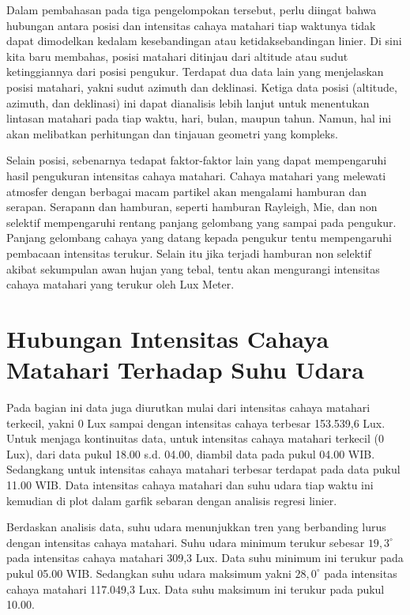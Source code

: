 Dalam pembahasan pada tiga pengelompokan tersebut, perlu diingat bahwa hubungan antara posisi dan intensitas cahaya matahari tiap waktunya tidak dapat dimodelkan kedalam kesebandingan atau ketidaksebandingan linier. Di sini kita baru membahas, posisi matahari ditinjau dari altitude atau sudut ketinggiannya dari posisi pengukur. Terdapat dua data lain yang menjelaskan posisi matahari, yakni sudut azimuth dan deklinasi. Ketiga data posisi (altitude, azimuth, dan deklinasi) ini dapat dianalisis lebih lanjut untuk menentukan lintasan matahari pada tiap waktu, hari, bulan, maupun tahun. Namun, hal ini akan melibatkan perhitungan dan tinjauan geometri yang kompleks.

Selain posisi, sebenarnya tedapat faktor-faktor lain yang dapat mempengaruhi hasil pengukuran intensitas cahaya matahari. Cahaya matahari yang melewati atmosfer dengan berbagai macam partikel akan mengalami hamburan dan serapan. Serapann dan hamburan, seperti hamburan Rayleigh, Mie, dan non selektif mempengaruhi rentang panjang gelombang yang sampai pada pengukur. Panjang gelombang cahaya yang datang kepada pengukur tentu mempengaruhi pembacaan intensitas terukur. Selain itu jika terjadi hamburan non selektif akibat sekumpulan awan hujan yang tebal, tentu akan mengurangi intensitas cahaya matahari yang terukur oleh Lux Meter.

\section{Hubungan Intensitas Cahaya Matahari Terhadap Suhu Udara}
Pada bagian ini data juga diurutkan mulai dari intensitas cahaya matahari terkecil, yakni 0 Lux sampai dengan intensitas cahaya terbesar 153.539,6 Lux. Untuk menjaga kontinuitas data, untuk intensitas cahaya matahari terkecil (0 Lux), dari data pukul 18.00 s.d. 04.00, diambil data pada pukul 04.00 WIB. Sedangkang untuk intensitas cahaya matahari terbesar terdapat pada data pukul 11.00 WIB. Data intensitas cahaya matahari dan suhu udara tiap waktu ini kemudian di plot dalam garfik sebaran dengan analisis regresi linier.

Berdaskan analisis data, suhu udara menunjukkan tren yang berbanding lurus dengan intensitas cahaya matahari. Suhu udara minimum terukur sebesar $19,3^\circ$ pada intensitas cahaya matahari 309,3 Lux. Data suhu minimum ini terukur pada pukul 05.00 WIB. Sedangkan suhu udara maksimum yakni $28,0^\circ$ pada intensitas cahaya matahari 117.049,3 Lux. Data suhu maksimum ini terukur pada pukul 10.00. 

